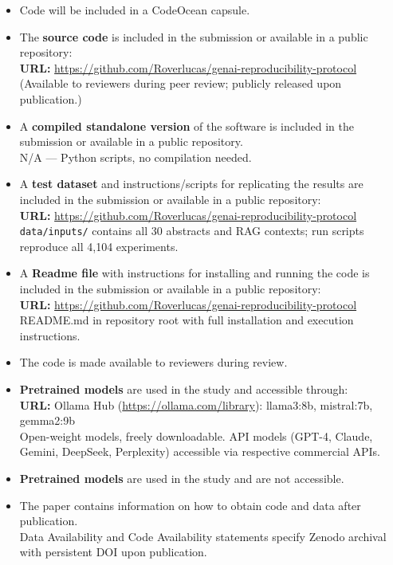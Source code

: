 \documentclass[11pt]{article}
\newcommand{\yes}{\rlap{$\checkmark$}\square}
\newcommand{\no}{\square}
\begin{document}
\begin{itemize}[leftmargin=2em]
\item[$\no$] Code will be included in a CodeOcean capsule.

\item[$\yes$] The \textbf{source code} is included in the submission or available in a public repository:\\
\textbf{URL:} \url{https://github.com/Roverlucas/genai-reproducibility-protocol}\\
{\small (Available to reviewers during peer review; publicly released upon publication.)}

\item[$\no$] A \textbf{compiled standalone version} of the software is included in the submission or available in a public repository.\\
{\small N/A --- Python scripts, no compilation needed.}

\item[$\yes$] A \textbf{test dataset} and instructions/scripts for replicating the results are included in the submission or available in a public repository:\\
\textbf{URL:} \url{https://github.com/Roverlucas/genai-reproducibility-protocol}\\
{\small \texttt{data/inputs/} contains all 30 abstracts and RAG contexts; run scripts reproduce all 4,104 experiments.}

\item[$\yes$] A \textbf{Readme file} with instructions for installing and running the code is included in the submission or available in a public repository:\\
\textbf{URL:} \url{https://github.com/Roverlucas/genai-reproducibility-protocol}\\
{\small README.md in repository root with full installation and execution instructions.}

\item[$\yes$] The code is made available to reviewers during review.

\item[$\yes$] \textbf{Pretrained models} are used in the study and accessible through:\\
\textbf{URL:} Ollama Hub (\url{https://ollama.com/library}): llama3:8b, mistral:7b, gemma2:9b\\
{\small Open-weight models, freely downloadable. API models (GPT-4, Claude, Gemini, DeepSeek, Perplexity) accessible via respective commercial APIs.}

\item[$\no$] \textbf{Pretrained models} are used in the study and are not accessible.

\item[$\yes$] The paper contains information on how to obtain code and data after publication.\\
{\small Data Availability and Code Availability statements specify Zenodo archival with persistent DOI upon publication.}
\end{itemize}
\end{document}
